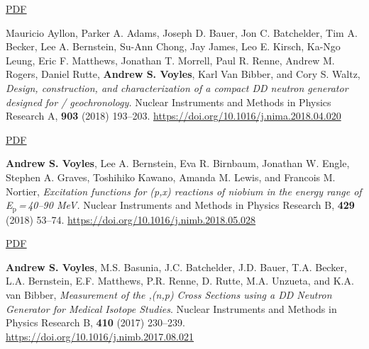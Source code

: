 \begin{bibsection}
\ifshort \vspace{0.1cm} \href{https://avoyles.github.io/papers/ASV_Dissertation.pdf}{\underline{PDF}} \else  \fi 



    

\item Mauricio Ayllon, Parker A. Adams, Joseph D. Bauer, Jon C. Batchelder, Tim A. Becker, Lee A. Bernstein, Su-Ann Chong, Jay James, Leo E. Kirsch, Ka-Ngo Leung, Eric F. Matthews, Jonathan T. Morrell, Paul R. Renne, Andrew M. Rogers, Daniel Rutte, \textbf{Andrew S. Voyles}, Karl Van Bibber, and Cory S. Waltz, \emph{Design, construction, and characterization of a compact DD neutron generator designed for / geochronology.} Nuclear Instruments and Methods in Physics Research  A, 
\textbf{903} (2018) 193--203. \url{https://doi.org/10.1016/j.nima.2018.04.020} 

\ifshort \vspace{0.1cm} \href{https://avoyles.github.io/papers/Ayllon2018_geochronology.pdf}{\underline{PDF}} \else  \fi 

\item \textbf{Andrew S. Voyles}, Lee A. Bernstein, Eva R. Birnbaum, Jonathan W. Engle, Stephen A. Graves, Toshihiko Kawano, Amanda M. Lewis, and Francois M. Nortier, \emph{Excitation functions for (p,x) reactions of niobium in the energy range of  E$_{\text{p}}$\,=\,40--90 MeV.} Nuclear Instruments and Methods in Physics Research  B,
\textbf{429} (2018) 53--74. \url{https://doi.org/10.1016/j.nimb.2018.05.028}



\ifshort \vspace{0.1cm} \href{https://avoyles.github.io/papers/Voyles2018_Nb_px.pdf}{\underline{PDF}} \else  \fi



\item \textbf{Andrew S. Voyles}, M.S. Basunia, J.C. Batchelder, J.D. Bauer, T.A. Becker, L.A. Bernstein, E.F. Matthews, P.R. Renne, D. Rutte, M.A. Unzueta, and K.A. van Bibber, \emph{Measurement of the ,(n,p) Cross Sections using a DD Neutron Generator for Medical Isotope Studies}. Nuclear Instruments and Methods in Physics Research  B, \textbf{410} (2017) 230--239. \url{https://doi.org/10.1016/j.nimb.2017.08.021}


\end{bibsection}
